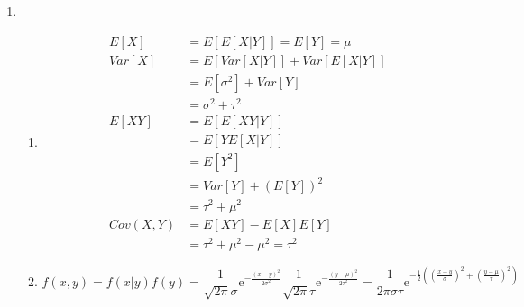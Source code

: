 \documentclass{article}
\begin{document}
\begin{enumerate}[leftmargin = 0 em, label = \arabic*., font = \bfseries]
\begin{enumerate}
 	\end{enumerate}

 	\item 
 	\begin{enumerate}
 		\item 
 		\begin{align*}
 	E[X] & = E[E[X|Y]] = E[Y] = \mu\\
 	Var[X] & = E[Var[X|Y]] + Var[E[X|Y]]\\
 	& = E[\sigma^2] + Var[Y]\\
 	& = \sigma^2 + \tau^2\\
 	E[XY] & = E[E[XY|Y]]\\
 	& = E[Y E[X|Y]]\\
 	& = E[Y^2]\\
 	& = Var[Y] + (E[Y])^2\\
 	& = \tau^2 + \mu^2\\
 	Cov(X,Y) & = E[XY] - E[X]E[Y]\\
 	& = \tau^2 + \mu^2 - \mu^2 = \tau^2
 	\end{align*}
 	
 	\item 
 	\[f(x,y) = f(x|y)f(y) = \frac{1}{\sqrt{2 \pi} \sigma} \mathrm{e}^{- \frac{(x - y)^2}{2 \sigma^2}} \frac{1}{\sqrt{2 \pi} \tau} \mathrm{e}^{- \frac{(y - \mu)^2}{2 \tau^2}} = \frac{1}{2 \pi \sigma \tau} \mathrm{e}^{-\frac{1}{2}((\frac{x - y}{\sigma})^2 + (\frac{y - \mu}{\tau})^2)}\]


\end{enumerate}
\end{enumerate}
\end{document}
